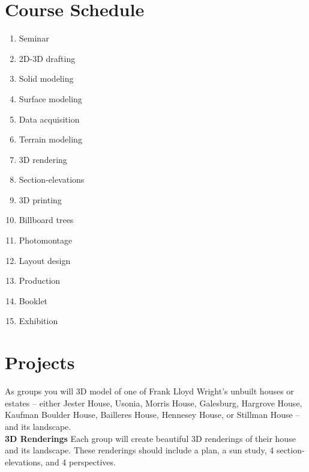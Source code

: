 \documentclass[11pt,article,oneside]{memoir}
\begin{document}
\clearpage


\section{Course Schedule}

\begin{multicols}{3}
\begin{enumerate}[label=\textbf{\arabic*}]
%
\item Seminar
\item  2D-3D drafting
\item Solid modeling
\item Surface modeling
\item Data acquisition
\item Terrain modeling
\item 3D rendering
\item Section-elevations
\item 3D printing
\item Billboard trees
\item Photomontage
\item Layout design
\item Production
%
\item Booklet
\item Exhibition
%
\end{enumerate}
\end{multicols}


\section{Projects}
As groups %
you will 3D model of one of 
Frank Lloyd Wright's unbuilt houses or estates
-- either Jester House, Usonia, Morris House, Galesburg, 
Hargrove House, Kaufman Boulder House, Bailleres House, 
Hennesey House, or Stillman House -- 
and its landscape.\\

\noindent \textbf{3D Renderings}
Each group will create beautiful 3D renderings
of their house and its landscape. 
These renderings should include 
a plan,
a sun study, 
4 section-elevations, 
and 4 perspectives.\\
\end{document}
